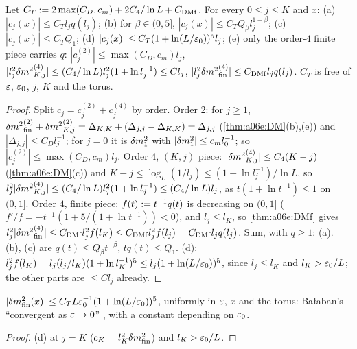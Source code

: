 \begin{theorem}\label{thm:a06e:T0}
Let $C_T:=2\max(C_D,c_m)+2C_4/\ln L+C_{\mathrm{DMf}}$. For every $0\le j\le K$ and $x$: \textup{(a)} $|c_j(x)|\le C_Tl_jq(l_j)$; \textup{(b)} for $\beta\in(0,5]$, $|c_j(x)|\le C_TQ_\beta l_j^{1-\beta}$; \textup{(c)} $|c_j(x)|\le C_TQ_1$; \textup{(d)} $|c_j(x)|\le C_T(1+\ln(L/\varepsilon_0))^5l_j$; \textup{(e)} only the order-$4$ finite piece carries $q$: $|c^{(2)}_j|\le\max(C_D,c_m)l_j$, $|l_j^2{\delta m^2}^{(4)}_{K,j}|\le(C_4/\ln L)l_j^2(1+\ln l_j^{-1})\le Cl_j$, $|l_j^2{\delta m^2}^{(4)}_{\mathrm{fin}}|\le C_{\mathrm{DMf}}l_jq(l_j)$. $C_T$ is free of $\varepsilon$, $\varepsilon_0$, $j$, $K$ and the torus.
\end{theorem}

\begin{proof}
Split $c_j=c^{(2)}_j+c^{(4)}_j$ by order. Order $2$: for $j\ge1$, ${\delta m^2}^{(2)}_{\mathrm{fin}}+{\delta m^2}^{(2)}_{K,j}=\Delta_{K,K}+(\Delta_{j,j}-\Delta_{K,K})=\Delta_{j,j}$ (\cref{thm:a06e:DM}(b),(e)) and $|\Delta_{j,j}|\le C_Dl_j^{-1}$; for $j=0$ it is $\delta m^2_1$ with $|\delta m^2_1|\le c_ml_0^{-1}$; so $|c^{(2)}_j|\le\max(C_D,c_m)l_j$. Order $4$, $(K,j)$ piece: $|{\delta m^2}^{(4)}_{K,j}|\le C_4(K-j)$ (\cref{thm:a06e:DM}(c)) and $K-j\le\log_L(1/l_j)\le(1+\ln l_j^{-1})/\ln L$, so $l_j^2|{\delta m^2}^{(4)}_{K,j}|\le(C_4/\ln L)l_j^2(1+\ln l_j^{-1})\le(C_4/\ln L)l_j$, as $t(1+\ln t^{-1})\le1$ on $(0,1]$. Order $4$, finite piece: $f(t):= t^{-1}q(t)$ is decreasing on $(0,1]$ ($f'/f=-t^{-1}(1+5/(1+\ln t^{-1}))<0$), and $l_j\le l_K$, so \cref{thm:a06e:DMf} gives $l_j^2|{\delta m^2}^{(4)}_{\mathrm{fin}}|\le C_{\mathrm{DMf}}l_j^2f(l_K)\le C_{\mathrm{DMf}}l_j^2f(l_j)=C_{\mathrm{DMf}}l_jq(l_j)$. Sum, with $q\ge1$: (a). (b), (c) are $q(t)\le Q_\beta t^{-\beta}$, $tq(t)\le Q_1$. (d): $l_j^2f(l_K)=l_j(l_j/l_K)(1+\ln l_K^{-1})^5\le l_j(1+\ln(L/\varepsilon_0))^5$, since $l_j\le l_K$ and $l_K>\varepsilon_0/L$; the other parts are $\le Cl_j$ already.
\end{proof}

\begin{corollary}\label{cor:a06e:T0p}
$|\delta m^2_{\mathrm{fin}}(x)|\le C_TL\varepsilon_0^{-1}(1+\ln(L/\varepsilon_0))^5$, uniformly in $\varepsilon$, $x$ and the torus: Ba{\l}aban's ``convergent as $\varepsilon\to0$'' \cite[(1.26)]{Ba3}, with a constant depending on $\varepsilon_0$.
\end{corollary}

\begin{proof}
(d) at $j=K$ ($c_K=l_K^2\delta m^2_{\mathrm{fin}}$) and $l_K>\varepsilon_0/L$.
\end{proof}

